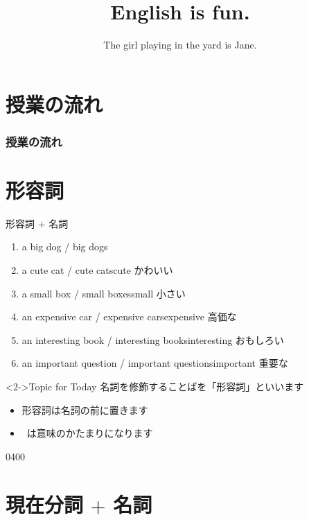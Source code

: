 \documentclass[aspectratio=169,xcolor={dvipsnames,table}]{beamer}
\title{English is fun.}
\subtitle{The girl playing in the yard is Jane.}
\author{}
\institute[]{}
\date[]
\begin{document}
\begin{frame}[plain]
  \titlepage
\end{frame}

\section*{授業の流れ}
\begin{frame}[plain]
  \frametitle{授業の流れ}
  \tableofcontents
\end{frame}

\section{形容詞}
 \begin{frame}[plain]{形容詞 $+$ 名詞}
 \begin{enumerate}
  \item a big dog / big dogs
  \item a cute cat / cute cats\hfill{\scriptsize cute  かわいい}
  \item a small box / small boxes\hfill{\scriptsize small  小さい}
  \item an expensive car / expensive cars\hfill{\scriptsize expensive  高価な}
  \item an interesting book / interesting books\hfill{\scriptsize interesting  おもしろい}
  \item an important question / important questions\hfill{\scriptsize important  重要な}
 \end{enumerate}

\begin{block}<2->{Topic for Today}\small
名詞を修飾することばを「形容詞」といいます
\begin{itemize}[square]\small
 \item 形容詞は名詞の前に置きます
 \item {}\,\,\,は意味のかたまりになります
 \end{itemize}
     \end{block}

\mbox{}\hfill{\tiny 0400}\,{\scriptsize {}}
 \end{frame}
\section{現在分詞 $+$ 名詞}
\end{document}

